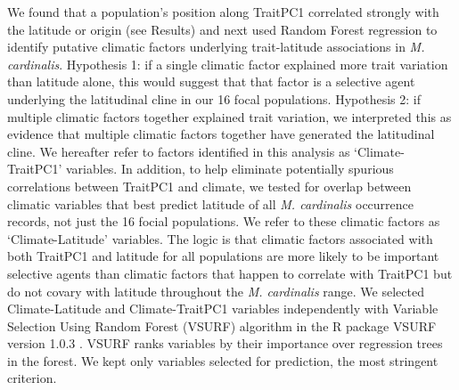 \documentclass[11pt, oneside]{article}
\newcommand{\pkg}[1]{{\fontseries{b}\selectfont #1}}
\newcommand{\ala}[1]{{ \color{blue} [{\bf{ALA:}} {\em#1}]}} %
\begin{document}
We found that a population's position along TraitPC1 correlated strongly with the latitude or origin (see Results) and next used Random Forest regression \citep{Liaw_Wiener_2002} to identify putative climatic factors underlying trait-latitude associations in \textit{M. cardinalis}. Hypothesis 1: if a single climatic factor explained more trait variation than latitude alone, this would suggest that that factor is a selective agent underlying the latitudinal cline in our 16 focal populations. Hypothesis 2: if multiple climatic factors together explained trait variation,  we interpreted this as evidence that multiple climatic factors together have generated the latitudinal cline. We hereafter refer to factors identified in this analysis as `Climate-TraitPC1' variables. In addition, to help eliminate potentially spurious correlations between TraitPC1 and climate, we tested for overlap between climatic variables that best predict latitude of all \textit{M. cardinalis} occurrence records, not just the 16 focial populations. We refer to these climatic factors as `Climate-Latitude' variables. The logic is that climatic factors associated with both TraitPC1 and latitude for all populations are more likely to be important selective agents than climatic factors that happen to correlate with TraitPC1 but do not covary with latitude throughout the \textit{M. cardinalis} range. We selected Climate-Latitude and Climate-TraitPC1 variables independently with Variable Selection Using Random Forest (VSURF) algorithm in the R package \pkg{VSURF} version 1.0.3 \citep{Genuer_etal_2016}. VSURF ranks variables by their importance over regression trees in the forest. We kept only variables selected for prediction, the most stringent criterion.

\end{document}
